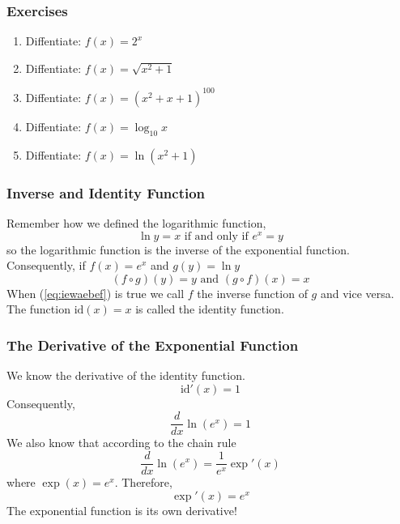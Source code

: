 \documentclass[xcolor=dvipsnames]{beamer}
\begin{document}
\begin{frame}
  \frametitle{Exercises}
  \begin{enumerate}
  \item<1-> Diffentiate: $f(x)=2^{x}$
  \item<2-> Diffentiate: $f(x)=\sqrt{x^{2}+1}$
  \item<3-> Diffentiate: $f(x)=(x^{2}+x+1)^{100}$
  \item<4-> Diffentiate: $f(x)=\log_{10}x$
  \item<5-> Diffentiate: $f(x)=\ln(x^{2}+1)$
  \end{enumerate}
\end{frame}

\begin{frame}
  \frametitle{Inverse and Identity Function}
Remember how we defined the logarithmic function,
\begin{equation}
  \label{eq:tieteiph}
  \ln{}y=x\mbox{ if and only if }e^{x}=y
\end{equation}
so the logarithmic function is the inverse of the exponential
function. Consequently, if $f(x)=e^{x}$ and $g(y)=\ln{}y$
\begin{equation}
  \label{eq:iewaebef}
  (f\circ{}g)(y)=y\mbox{ and }(g\circ{}f)(x)=x
\end{equation}
When (\ref{eq:iewaebef}) is true we call $f$ the \alert{inverse
  function} of $g$ and vice versa. The function $\mbox{id}(x)=x$ is called
the \alert{identity function}. 
\end{frame}

\begin{frame}
  \frametitle{The Derivative of the Exponential Function}
We know the derivative of the identity function.
\begin{equation}
  \label{eq:sivahzuw}
  \mbox{id}'(x)=1
\end{equation}
Consequently,
\begin{equation}
  \label{eq:zeejaixu}
  \frac{d}{dx}\ln\left(e^{x}\right)=1
\end{equation}
We also know that according to the chain rule
\begin{equation}
  \label{eq:iecheixo}
  \frac{d}{dx}\ln\left(e^{x}\right)=\frac{1}{e^{x}}\exp'(x)
\end{equation}
where $\exp(x)=e^{x}$. Therefore,
\begin{equation}
  \label{eq:zigaewai}
  \exp'(x)=e^{x}
\end{equation}
The exponential function is its own derivative!
\end{frame}
\end{document}
